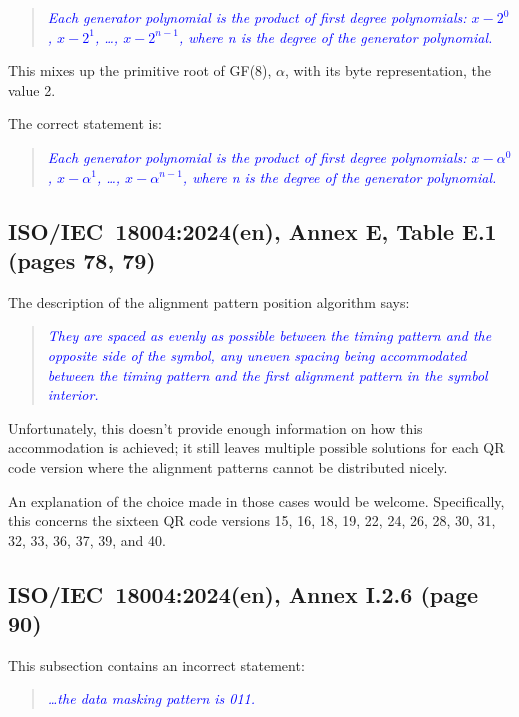 \documentclass[a4paper,twoside]{article}
\newcommand{\shortstandard}{ISO/IEC~18004}
\newcommand{\standard}{\shortstandard:2024(en)}
\newcommand{\quotestandard}[1]{\textcolor{blue}{\textit{#1}}}
\newcommand{\ddd}{\dots}
\newcommand{\change}[1]{\underline{\textbf{#1}}}
\begin{document}
\begin{quote}
\quotestandard{Each generator polynomial is the product of first degree polynomials: $x - 2^0$, $x - 2^1$, \dots, $x - 2^{n-1}$,
where n is the degree of the generator polynomial.}
\end{quote}

This mixes up the primitive root of GF(8), $\alpha$, with its byte representation, the value 2.

The correct statement is:

\begin{quote}
\quotestandard{Each generator polynomial is the product of first degree polynomials: \change{$x - \alpha^0$}, \change{$x - \alpha^1$}, \dots, \change{$x - \alpha^{n-1}$},
where n is the degree of the generator polynomial.}
\end{quote}

\subsection{\standard, Annex E, Table E.1 (pages 78, 79)}

The description of the alignment pattern position algorithm says:

\begin{quote}
\quotestandard{They are spaced as evenly as possible between the timing pattern and the opposite side of the symbol, any uneven
spacing being accommodated between the timing pattern and the first alignment pattern in the symbol interior.}
\end{quote}

Unfortunately, this doesn't provide enough information on how this accommodation is achieved; it still leaves multiple
possible solutions for each QR code version where the alignment patterns cannot be distributed nicely.

An explanation  of the choice made in those cases would be welcome. Specifically, this concerns the sixteen QR code versions
15, 16, 18, 19, 22, 24, 26, 28, 30, 31, 32, 33, 36, 37, 39, and 40.

\subsection{\standard, Annex I.2.6 (page 90)}
\label{sec:dmp-changed-2}

This subsection contains an incorrect statement:

\begin{quote}
\quotestandard{\ddd the data masking pattern is 011.}
\end{quote}
\end{document}
